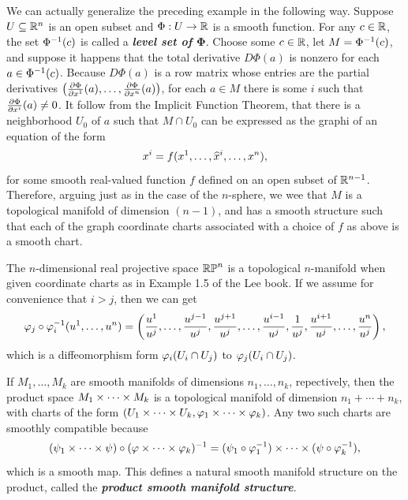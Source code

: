 \begin{ex}
We can actually generalize the preceding example in the following way. Suppose $U\subseteq \mathbb{R}^n$ is an open subset and $\Phi:U\rightarrow \mathbb{R}$ is a smooth function. For any $c\in \mathbb{R}$, the set $\Phi^{-1}(c)$ is called a \textbf{\textit{level set of $\boldsymbol{\Phi}$}}. Choose some $c\in \mathbb{R}$, let $M = \Phi^{-1}(c)$, and suppose it happens that the total derivative $D\Phi(a)$ is nonzero for each $a\in \Phi^{-1}(c)$. Because $D\Phi(a)$ is a row matrix whose entries are the partial derivatives $\left(\frac{\partial{\Phi}}{\partial{x^1}}(a),\ldots,\frac{\partial{\Phi}}{\partial{x^n}}(a)\right)$, for each $a\in M$ there is some $i$ such that $\frac{\partial{\Phi}}{\partial{x^i}}(a)\neq 0$. It follow from the Implicit Function Theorem, that there is a neighborhood $U_0$ of $a$ such that $M\cap U_0$ can be expressed as the graphi of an equation of the form 
\[x^i = f(x^1,\ldots,\widehat x^i, \ldots, x^n),\]
for some smooth real-valued function $f$ defined on an open subset of $\mathbb{R}^{n - 1}$. Therefore, arguing just as in the case of the $n$-sphere, we wee that $M$ is a topological manifold of dimension $(n -1)$, and has a smooth structure such that each of the graph coordinate charts associated with a choice of $f$ as above is a smooth chart. 
\end{ex}

\begin{ex}
The $n$-dimensional real projective space $\mathbb{RP}^n$ is a topological $n$-manifold when given coordinate charts as in Example 1.5 of the Lee book. If we assume for convenience that $i > j$, then we can get
\[\varphi_j\circ\varphi_i^{-1}(u^1,\ldots,u^n) = \left(\frac{u^1}{u^j},\ldots,\frac{u^{j - 1}}{u^j},\frac{u^{j + 1}}{u^j},\ldots,\frac{u^{i - 1}}{u^j},\frac{1}{u^j},\frac{u^{i + 1}}{u^j},\ldots,\frac{u^n}{u^j}\right),\]
which is a diffeomorphism form $\varphi_i(U_i\cap U_j)$ to $\varphi_j(U_i\cap U_j)$.
\end{ex}

\begin{ex}
If $M_1,\ldots,M_k$ are smooth manifolds of dimensions $n_1,\ldots,n_k$, repectively, then the product space $M_1\times \cdots \times M_k$ is a topological manifold of dimension $n_1 + \cdots + n_k$, with charts of the form $(U_1\times \cdots\times U_k, \varphi_1\times \cdots \times \varphi_k)$. Any two such charts are smoothly compatible because
\[(\psi_1\times\cdots\times \psi)\circ(\varphi\times \cdots\times\varphi_k)^{-1} = (\psi_1\circ\varphi_1^{-1})\times\cdots\times(\psi\circ\varphi_k^{-1}),\]
which is a smooth map. This defines a natural smooth manifold structure on the product, called the \textbf{\textit{product smooth manifold structure}}.
\end{ex}

